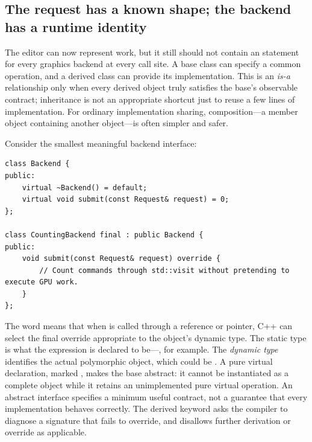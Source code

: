 \subsection{The request has a known shape; the backend has a runtime identity}\label{05-engine-i-ch004-the-request-has-a-known-shape-the-backend-has-a-runtime-identity}

\hypertarget{05-engine-i-ch004-the-request-has-a-known-shape-the-backend-has-a-runtime-identity}{}

The editor can now represent work, but it still should not contain an  statement for every graphics backend at every call site. A base class can specify a common operation, and a derived class can provide its implementation. This is an \emph{is-a} relationship only when every derived object truly satisfies the base's observable contract; inheritance is not an appropriate shortcut just to reuse a few lines of implementation. For ordinary implementation sharing, composition---a member object containing another object---is often simpler and safer.

Consider the smallest meaningful backend interface:

\begin{verbatim}
class Backend {
public:
    virtual ~Backend() = default;
    virtual void submit(const Request& request) = 0;
};

class CountingBackend final : public Backend {
public:
    void submit(const Request& request) override {
        // Count commands through std::visit without pretending to execute GPU work.
    }
};
\end{verbatim}

The word  means that when  is called through a  reference or pointer, C++ can select the final override appropriate to the object's dynamic type. The static type is what the expression is declared to be---, for example. The \emph{dynamic type} identifies the actual polymorphic object, which could be . A pure virtual declaration, marked , makes the base abstract: it cannot be instantiated as a complete object while it retains an unimplemented pure virtual operation. An abstract interface specifies a minimum useful contract, not a guarantee that every implementation behaves correctly. The derived  keyword asks the compiler to diagnose a signature that fails to override, and  disallows further derivation or override as applicable.

